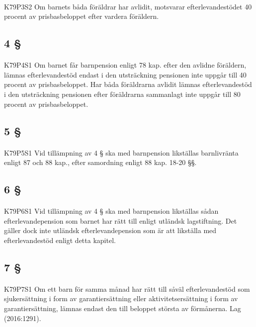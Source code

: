 \documentclass[a4paper,notitlepage,openany,10pt]{book}
\begin{document}
\paragraph*{}
{\tiny K79P3S2}
Om barnets båda föräldrar har avlidit, motsvarar efterlevandestödet 40 procent av prisbasbeloppet efter vardera föräldern.
\subsection*{4 §}
\paragraph*{}
{\tiny K79P4S1}
Om barnet får barnpension enligt 78 kap. efter den avlidne föräldern, lämnas efterlevandestöd endast i den utsträckning pensionen inte uppgår till 40 procent av prisbasbeloppet. Har båda föräldrarna avlidit lämnas efterlevandestöd i den utsträckning pensionen efter föräldrarna sammanlagt inte uppgår till 80 procent av prisbasbeloppet.
\subsection*{5 §}
\paragraph*{}
{\tiny K79P5S1}
Vid tillämpning av 4 § ska med barnpension likställas barnlivränta enligt 87 och 88 kap., efter samordning enligt 88 kap. 18-20 §§.
\subsection*{6 §}
\paragraph*{}
{\tiny K79P6S1}
Vid tillämpning av 4 § ska med barnpension likställas sådan efterlevandepension som barnet har rätt till enligt utländsk lagstiftning. Det gäller dock inte utländsk efterlevandepension som är att likställa med efterlevandestöd enligt detta kapitel.
\subsection*{7 §}
\paragraph*{}
{\tiny K79P7S1}
Om ett barn för samma månad har rätt till såväl efterlevandestöd som sjukersättning i form av garantiersättning eller aktivitetsersättning i form av garantiersättning, lämnas endast den till beloppet största av förmånerna.
Lag (2016:1291).
\end{document}
